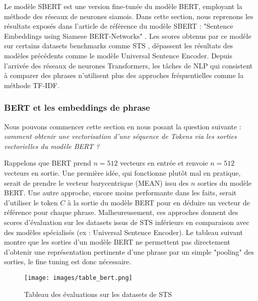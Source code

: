 \documentclass[12pt]{article}
\theoremstyle{definition}
\begin{document}
Le modèle SBERT est une version fine-tunée du modèle BERT, employant la méthode des réseaux de neurones siamois. Dans cette section, nous reprenons les résultats exposés dans l'article de référence du modèle SBERT : "Sentence Embeddings using Siamese BERT-Networks" \cite{sbert}. Les scores obtenus par ce modèle sur certains datasets benchmarks comme STS \cite{sts}, dépassent les résultats des modèles précédents comme le modèle Universal Sentence Encoder. Depuis l'arrivée des réseaux de neurones Transformers, les tâches de NLP qui consistent à comparer des phrases n'utilisent plus des approches fréquentielles comme la méthode TF-IDF.

\subsubsection{BERT et les embeddings de phrase}
Nous pouvons commencer cette section en nous posant la question suivante : \textit{comment obtenir une vectorisation d’une séquence de Tokens via les sorties vectorielles du modèle BERT ?}

Rappelons que BERT prend $n=512$ vecteurs en entrée et renvoie $n=512$ vecteurs en sortie. Une première idée, qui fonctionne plutôt mal en pratique, serait de prendre le vecteur barycentrique (MEAN) issu des $n$ sorties du modèle BERT. Une autre approche, encore moins performante dans les faits, serait d’utiliser le token $C$ à la sortie du modèle BERT pour en déduire un vecteur de référence pour chaque phrase. Malheureusement, ces approches donnent des scores d’évaluation sur les datasets issus de STS \cite{sts} inférieurs en comparaison avec des modèles spécialisés (ex : Universal Sentence Encoder). Le tableau suivant montre que les sorties d’un modèle BERT ne permettent pas directement d’obtenir une représentation pertinente d’une phrase par un simple "pooling" des sorties, le fine tuning est donc nécessaire.


\begin{figure*}[!h]
	\centering
	\texttt{[image: images/table\_bert.png]}
	\caption{Tableau des évaluations sur les datasets de STS \cite{sts}}
\end{figure*}
\end{document}
